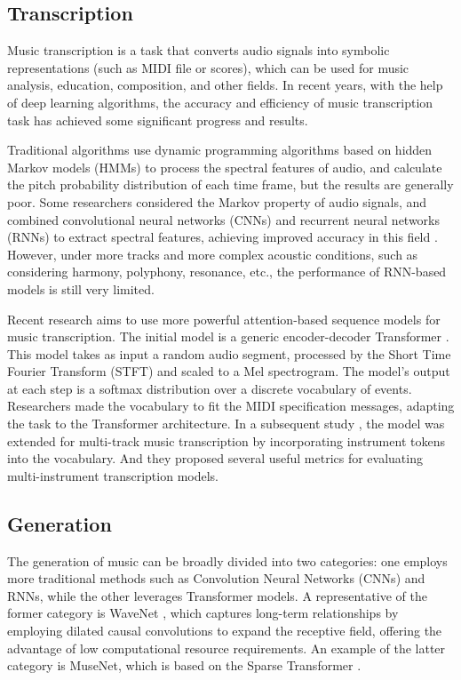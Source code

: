 \documentclass{article}
\begin{document}
\subsection{Transcription}

Music transcription is a task that converts audio signals into symbolic representations (such as MIDI file or scores), which can be used for music analysis, education, composition, and other fields. In recent years, with the help of deep learning algorithms, the accuracy and efficiency of music transcription task has achieved some significant progress and results.

Traditional algorithms use dynamic programming algorithms based on hidden Markov models (HMMs) to process the spectral features of audio, and calculate the pitch probability distribution of each time frame, but the results are generally poor. Some researchers considered the Markov property of audio signals, and combined convolutional neural networks (CNNs) and recurrent neural networks (RNNs) to extract spectral features, achieving improved accuracy in this field \citep{9413601}. However, under more tracks and more complex acoustic conditions, such as considering harmony, polyphony, resonance, etc., the performance of RNN-based models is still very limited.

Recent research aims to use more powerful attention-based sequence models for music transcription. The initial model is a generic encoder-decoder Transformer \citep{hawthorne2021sequence}. This model takes as input a random audio segment, processed by the Short Time Fourier Transform (STFT) and scaled to a Mel spectrogram. The model's output at each step is a softmax distribution over a discrete vocabulary of events. Researchers made the vocabulary to fit the MIDI specification messages, adapting the task to the Transformer architecture. In a subsequent study \citep{gardner2021mt3}, the model was extended for multi-track music transcription by incorporating instrument tokens into the vocabulary. And they proposed several useful metrics for evaluating multi-instrument transcription models.

\subsection{Generation}
The generation of music can be broadly divided into two categories: one employs more traditional methods such as Convolution Neural Networks (CNNs) and RNNs, while the other leverages Transformer models. A representative of the former category is WaveNet \citep{oord2016wavenet}, which captures long-term relationships by employing dilated causal convolutions to expand the receptive field, offering the advantage of low computational resource requirements. An example of the latter category is MuseNet, which is based on the Sparse Transformer \citep{child2019generating}. 
\end{document}
